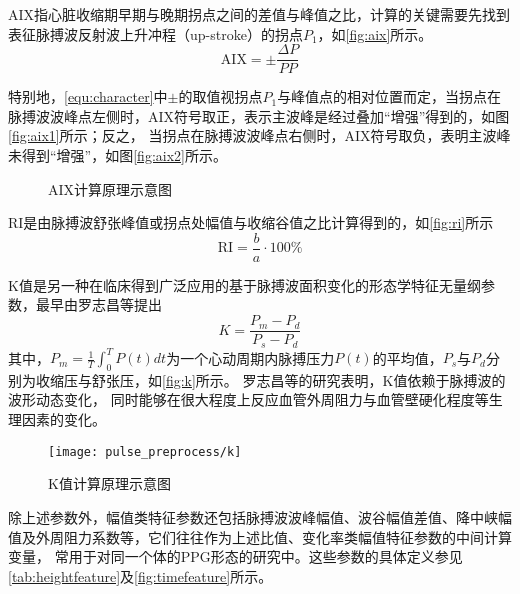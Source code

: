 AIX指心脏收缩期早期与晚期拐点之间的差值与峰值之比，计算的关键需要先找到表征脉搏波反射波上升冲程（up-stroke）的拐点$P_1$，如\autoref{fig:aix}所示\cite{Su2014}。
\begin{equation}
    \label{equ:aix}
    \text{AIX} = \pm \frac{\Delta P}{PP}
\end{equation}

特别地，\autoref{equ:character}中$\pm$的取值视拐点$P_1$与峰值点的相对位置而定，当拐点在脉搏波波峰点左侧时，AIX符号取正，表示主波峰是经过叠加“增强”得到的，如图\autoref{fig:aix1}所示；反之，
当拐点在脉搏波波峰点右侧时，AIX符号取负，表明主波峰未得到“增强”，如图\autoref{fig:aix2}所示。
\begin{figure}[htbp]
    \centering
    \quad
    \caption[AIX计算原理示意图]{\label{fig:aix}AIX计算原理示意图\cite{Su2014}}
\end{figure}

RI是由脉搏波舒张峰值或拐点处幅值与收缩谷值之比计算得到的，如\autoref{fig:ri}所示\cite{Su2014,Elgendi2012}
\begin{equation}
    \label{equ:ri}
    \text{RI} = \frac{b}{a} \cdot 100\%
\end{equation}

K值是另一种在临床得到广泛应用的基于脉搏波面积变化的形态学特征无量纲参数，最早由罗志昌等\cite{Luo1988,PPGYY}提出
\begin{equation}
    \label{equ:ppgk}
    K=\frac{P_m-P_d}{P_s-P_d}
\end{equation}
其中，$P_m=\frac{1}{T}\int_{0}^{T}P(t)dt$为一个心动周期内脉搏压力$P(t)$的平均值，$P_s$与$P_d$分别为收缩压与舒张压，如\autoref{fig:k}所示。
罗志昌等\cite{Luo1988,PPGYY}的研究表明，K值依赖于脉搏波的波形动态变化，
同时能够在很大程度上反应血管外周阻力与血管壁硬化程度等生理因素的变化。
\begin{figure}[htbp]
    \centering
    \texttt{[image: pulse\_preprocess/k]}
    \caption{\label{fig:k}K值计算原理示意图}
\end{figure}

除上述参数外，幅值类特征参数还包括脉搏波波峰幅值、波谷幅值差值、降中峡幅值及外周阻力系数等，它们往往作为上述比值、变化率类幅值特征参数的中间计算变量，
常用于对同一个体的PPG形态的研究中\cite{mmt}。这些参数的具体定义参见\autoref{tab:heightfeature}及\autoref{fig:timefeature}所示。

